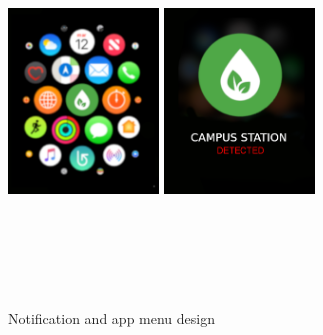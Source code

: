 \documentclass[12pt]{article} %
\begin{document}
\begin{figure}[H]
  \centering
  \includegraphics[width=4cm,height=10cm,keepaspectratio]{img/MenuHome.png}
  \hspace{0.05\textwidth}
  \includegraphics[width=4cm,height=10cm,keepaspectratio]{img/Notification.png}
  \hfill
  \caption{Notification and app menu design}
  \label{fig:boat1}
\end{figure}
\end{document}
